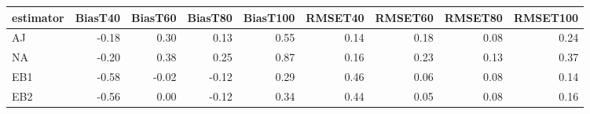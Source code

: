 \begin{table}[ht]
\centering
\begin{tabular}{lrrrrrrrr}
  \toprule
estimator & BiasT40 & BiasT60 & BiasT80 & BiasT100 & RMSET40 & RMSET60 & RMSET80 & RMSET100 \\ 
  \midrule
AJ & -0.18 & 0.30 & 0.13 & 0.55 & 0.14 & 0.18 & 0.08 & 0.24 \\ 
  NA & -0.20 & 0.38 & 0.25 & 0.87 & 0.16 & 0.23 & 0.13 & 0.37 \\ 
  EB1 & -0.58 & -0.02 & -0.12 & 0.29 & 0.46 & 0.06 & 0.08 & 0.14 \\ 
  EB2 & -0.56 & 0.00 & -0.12 & 0.34 & 0.44 & 0.05 & 0.08 & 0.16 \\ 
   \bottomrule
\end{tabular}
\end{table}
